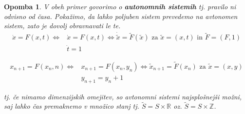 \documentclass{article}
\newtheorem{opomba}{Opomba}
\newcommand{\Z}{\mathbb{Z}}
\newcommand{\R}{\mathbb{R}}
\begin{document}
\begin{opomba}
V obeh primer govorimo o \textbf{autonomnih sistemih} tj. pravilo ni odvisno od časa. Pokažimo, da lahko poljuben sistem prevedemo na avtonomen sistem, zato je dovolj obravnavati le te.
\begin{align*}
\dot{x} = F(x,t) \iff  &\dot{x} = F(x, t) \iff \dot{\tilde{x}} = \tilde{F}(\tilde{x}) \text{ za } \tilde{x} = (x, t) \text{ in } \tilde{F} = (F, 1) \\ 
&\dot{t} = 1
\end{align*}

\begin{align*}
x_{n+1} = F(x_n,n) \iff  &x_{n+1} = F(x_n, y_n) \iff \tilde{x}_{n+1} = \tilde{F}(x_n) \text{ za } \tilde{x} = (x, y) \\ 
                         &y_{n+1} = y_n + 1
\end{align*}

tj. če nimamo dimenzijskih omejitev, so avtonomni sistemi najsplošnejši možni, saj lahko čas premaknemo v množico stanj tj. $\tilde{S} = S \times \R$ oz. $\tilde{S} = S \times \Z$.
\end{opomba}
\end{document}
